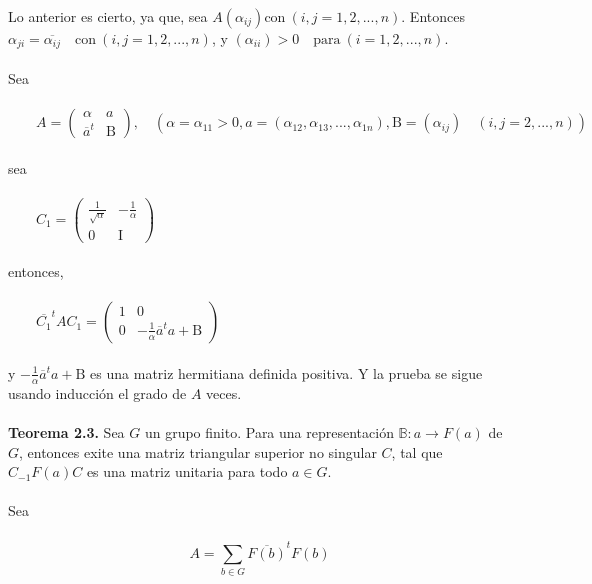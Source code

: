 \documentclass[12pt]{book}
\theoremstyle{definition}
\newcounter{in}
\newcounter{ini}
\begin{document}
Lo anterior es cierto, ya que, sea $A\left(\alpha_{ij}\right) \mathrm{con\ } \left(i,j=1,2,...,n\right)$. Entonces $\alpha_{ji}=\overline{\alpha_{ij}} \quad \mathrm{con\ } \left(i,j=1,2,...,n\right)$, y $\left(\alpha_{ii}\right)>0 \quad \mathrm{para\ } \left(i=1,2,...,n\right)$.\\~\\
Sea\\~\\
$\qquad 
A=
\begin{pmatrix}
\alpha & a \\ 
\overline{a}^{t} & \mathrm{B}
\end{pmatrix}, \quad \left(\alpha=\alpha_{11}>0,
a=\left(\alpha_{12},\alpha_{13},...,\alpha_{1n}\right),
\mathrm{B}=\left(\alpha_{ij}\right) \quad \left(i,j=2,...,n\right) \right) $\\~\\
sea\\~\\
$\qquad 
C_{1}=
\begin{pmatrix}
\frac{1}{\sqrt{\alpha}} & -\frac{1}{\alpha} \\ 
0 & \mathrm{I}
\end{pmatrix}$\\~\\
entonces, \\~\\
$\qquad 
\overline{C_{1}}^{t}AC_{1} =
\begin{pmatrix}
1 & 0 \\ 
0 & -\frac{1}{\alpha}\overline{a}^{t}a+\mathrm{B}
\end{pmatrix}$\\~\\
y $-\frac{1}{\alpha}\overline{a}^{t}a+\mathrm{B}$ es una matriz hermitiana definida positiva. Y la prueba se sigue usando inducción el grado de $A$ veces.\\~\\
\textbf{Teorema 2.3.} Sea $G$ un grupo finito. Para una representación $\mathbb{B}: a\rightarrow F\left(a\right)$ de $G$, entonces exite una matriz triangular superior no singular $C$, tal que $C_{-1}F\left(a\right)C$ es una matriz unitaria para todo $a \in G$.\\~\\
Sea\\~\\
\begin{equation*}
A=\sum_{b \in G} \overline{F\left(b\right)}^{t}F\left(b\right)
\end{equation*}
\end{document}
